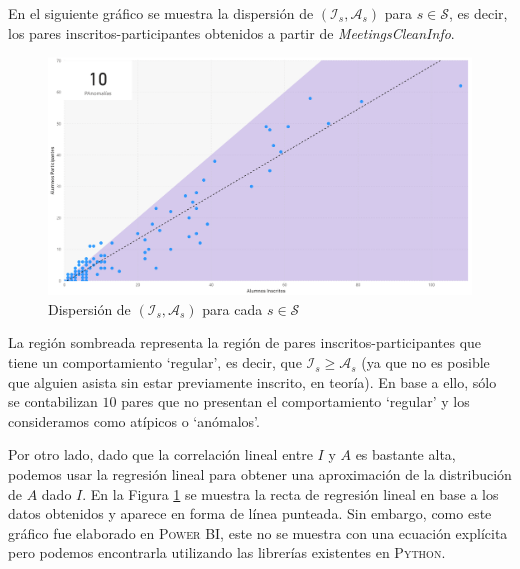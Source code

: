 \documentclass[11pt,a4paper]{book}
\theoremstyle{definition}%
\begin{document}
                En el siguiente gráfico se muestra la dispersión de $(\mathcal{I}_s,\mathcal{A}_s)$ para $s\in\mathcal{S}$, es decir, los pares inscritos-participantes obtenidos a partir de \textit{MeetingsCleanInfo}.
                \begin{figure}[H]
                    \centering
                    \includegraphics[width=1\textwidth]{Sources/dispersion_InscritosParticipantes.png}
                    \caption{Dispersión de $(\mathcal{I}_s,\mathcal{A}_s)$ para cada $s\in\mathcal{S}$}
                    \label{fig:dispersion_InscritosParticipantes}
                \end{figure}
                La región sombreada representa la región de pares inscritos-participantes que tiene un comportamiento `regular', es decir, que $\mathcal{I}_s\geq \mathcal{A}_s$ (ya que no es posible que alguien asista sin estar previamente inscrito, en teoría). En base a ello, sólo se contabilizan $10$ pares que no presentan el comportamiento `regular' y los consideramos como atípicos o `anómalos'.

                Por otro lado, dado que la correlación lineal entre $I$ y $A$ es bastante alta, podemos usar la regresión lineal para obtener una aproximación de la distribución de $A$ dado $I$. En la Figura \ref{fig:dispersion_InscritosParticipantes} se muestra la recta de regresión lineal en base a los datos obtenidos y aparece en forma de línea punteada. Sin embargo, como este gráfico fue elaborado en \textsc{Power BI}, este no se muestra con una ecuación explícita pero podemos encontrarla utilizando las librerías existentes en \textsc{Python}.
\end{document}

